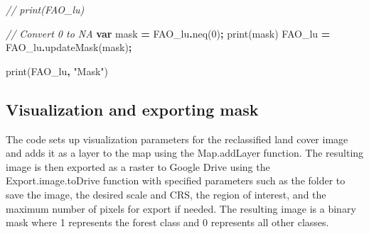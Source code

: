 \documentclass[
  10pt,
  b5paper,
  oneside]{book}
\newenvironment{Shaded}{\begin{snugshade}}{\end{snugshade}}
\newcommand{\CommentTok}[1]{\textcolor[rgb]{0.56,0.35,0.01}{\textit{#1}}}
\newcommand{\DecValTok}[1]{\textcolor[rgb]{0.00,0.00,0.81}{#1}}
\newcommand{\FunctionTok}[1]{\textcolor[rgb]{0.00,0.00,0.00}{#1}}
\newcommand{\KeywordTok}[1]{\textcolor[rgb]{0.13,0.29,0.53}{\textbf{#1}}}
\newcommand{\NormalTok}[1]{#1}
\newcommand{\OperatorTok}[1]{\textcolor[rgb]{0.81,0.36,0.00}{\textbf{#1}}}
\newcommand{\StringTok}[1]{\textcolor[rgb]{0.31,0.60,0.02}{#1}}
\begin{document}
\begin{Shaded}
\begin{Highlighting}[]
\CommentTok{// print(FAO\_lu)}

\CommentTok{// Convert 0 to NA}
\KeywordTok{var}\NormalTok{ mask }\OperatorTok{=}\NormalTok{ FAO\_lu}\OperatorTok{.}\FunctionTok{neq}\NormalTok{(}\DecValTok{0}\NormalTok{)}\OperatorTok{;}
\FunctionTok{print}\NormalTok{(mask)}
\NormalTok{FAO\_lu }\OperatorTok{=}\NormalTok{ FAO\_lu}\OperatorTok{.}\FunctionTok{updateMask}\NormalTok{(mask)}\OperatorTok{;}

\FunctionTok{print}\NormalTok{(FAO\_lu}\OperatorTok{,} \StringTok{"Mask"}\NormalTok{)}
\end{Highlighting}
\end{Shaded}

\hypertarget{visualization-and-exporting-mask}{%
\subsection{Visualization and exporting mask}\label{visualization-and-exporting-mask}}

The code sets up visualization parameters for the reclassified land cover image and adds it as a layer to the map using the Map.addLayer function. The resulting image is then exported as a raster to Google Drive using the Export.image.toDrive function with specified parameters such as the folder to save the image, the desired scale and CRS, the region of interest, and the maximum number of pixels for export if needed. The resulting image is a binary mask where 1 represents the forest class and 0 represents all other classes.
\end{document}
